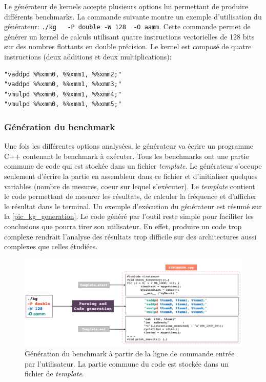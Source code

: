             Le générateur de kernels accepte plusieurs options lui permettant de produire différents benchmarks. La commande suivante montre un exemple d'utilisation du générateur: \verb|./kg   -P double -W 128  -O aamm|. Cette commande permet de générer un kernel de calculs utilisant quatre instructions vectorielles de 128 bits sur des nombres flottants en double précision. Le kernel est composé de quatre instructions (deux additions et deux multiplications):
        \begin{verbatim}
"vaddpd %%xmm0, %%xmm1, %%xmm2;"
"vaddpd %%xmm0, %%xmm1, %%xmm3;"
"vmulpd %%xmm0, %%xmm1, %%xmm4;"
"vmulpd %%xmm0, %%xmm1, %%xmm5;"
        \end{verbatim}
        
      
        
    
    \subsubsection{Génération du benchmark}
        
        Une fois les différentes options analysées, le générateur va écrire un programme C++ contenant le benchmark à exécuter. Tous les benchmarks ont une partie commune de code qui est stockée dans un fichier \textit{template}. Le générateur s'occupe seulement d'écrire la partie en assembleur dans ce fichier et d'initialiser quelques variables (nombre de mesures, coeur sur lequel s'exécuter). Le \textit{template} contient le code permettant de mesurer les résultats, de calculer la fréquence et d'afficher le résultat  dans le terminal. Un exemple d'exécution du générateur est résumé sur la \autoref{pic_kg_generation}. Le code généré par l'outil reste simple pour faciliter les conclusions que pourra tirer son utilisateur. En effet, produire un code trop complexe rendrait l'analyse des résultats trop difficile sur des  architectures aussi complexes que celles étudiées. 

        \begin{figure}[h!]
            \center
            \includegraphics[width=16cm]{images/kg_generation.png}
            \caption{\label{pic_kg_generation}Génération du benchmark à partir de la ligne de commande entrée par l'utilisateur. La partie commune du code est stockée dans un fichier de \textit{template}.}
        \end{figure}
        

